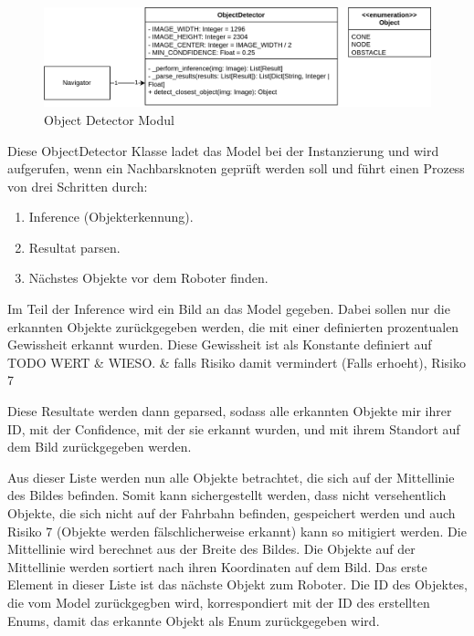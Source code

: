  \begin{figure}[H]
\centering
\includegraphics[width= \textwidth ]{assets/IT/robot-sw-architecture-object-detector.png}
\caption{Object Detector Modul}
\label{fig:nav-object-detector}
\end{figure}

Diese ObjectDetector Klasse ladet das Model bei der Instanzierung und wird aufgerufen, wenn ein Nachbarsknoten geprüft werden soll und führt einen Prozess von drei Schritten durch:

\begin{enumerate}
    \item Inference (Objekterkennung).
    \item Resultat parsen.
    \item Nächstes Objekte vor dem Roboter finden.
\end{enumerate}

Im Teil der Inference wird ein Bild an das Model gegeben. Dabei sollen nur die erkannten Objekte zurückgegeben werden, die mit einer definierten prozentualen Gewissheit erkannt wurden. Diese Gewissheit ist als Konstante definiert auf TODO WERT \& WIESO. \& falls Risiko damit vermindert (Falls erhoeht), Risiko 7

Diese Resultate werden dann geparsed, sodass alle erkannten Objekte mir ihrer ID, mit der Confidence, mit der sie erkannt wurden, und mit ihrem Standort auf dem Bild zurückgegeben werden.

Aus dieser Liste werden nun alle Objekte betrachtet, die sich auf der Mittellinie des Bildes befinden. Somit kann sichergestellt werden, dass nicht versehentlich Objekte, die sich nicht auf der Fahrbahn befinden, gespeichert werden und auch Risiko 7 (Objekte werden fälschlicherweise erkannt) kann so mitigiert werden. Die Mittellinie wird berechnet aus der Breite des Bildes. Die Objekte auf der Mittellinie werden sortiert nach ihren Koordinaten auf dem Bild. Das erste Element in dieser Liste ist das nächste Objekt zum Roboter. Die ID des Objektes, die vom Model zurückgegben wird, korrespondiert mit der ID des erstellten Enums, damit das erkannte Objekt als Enum zurückgegeben wird.

